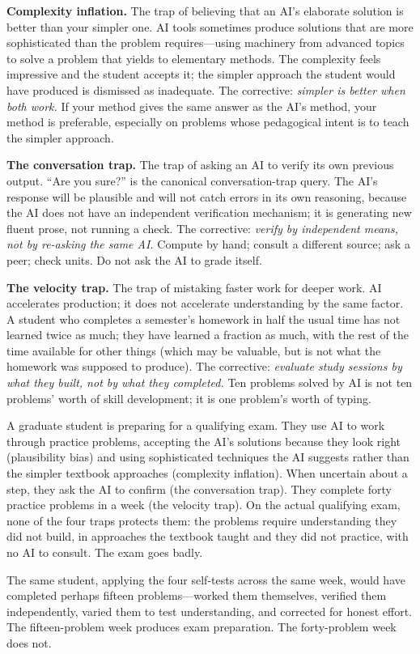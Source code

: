 \documentclass[11pt]{book}
\begin{document}
\textbf{Complexity inflation.} The trap of believing that an AI's elaborate solution is better than your simpler one. AI tools sometimes produce solutions that are more sophisticated than the problem requires---using machinery from advanced topics to solve a problem that yields to elementary methods. The complexity feels impressive and the student accepts it; the simpler approach the student would have produced is dismissed as inadequate. The corrective: \emph{simpler is better when both work.} If your method gives the same answer as the AI's method, your method is preferable, especially on problems whose pedagogical intent is to teach the simpler approach.

\textbf{The conversation trap.} The trap of asking an AI to verify its own previous output. ``Are you sure?'' is the canonical conversation-trap query. The AI's response will be plausible and will not catch errors in its own reasoning, because the AI does not have an independent verification mechanism; it is generating new fluent prose, not running a check. The corrective: \emph{verify by independent means, not by re-asking the same AI.} Compute by hand; consult a different source; ask a peer; check units. Do not ask the AI to grade itself.

\textbf{The velocity trap.} The trap of mistaking faster work for deeper work. AI accelerates production; it does not accelerate understanding by the same factor. A student who completes a semester's homework in half the usual time has not learned twice as much; they have learned a fraction as much, with the rest of the time available for other things (which may be valuable, but is not what the homework was supposed to produce). The corrective: \emph{evaluate study sessions by what they built, not by what they completed.} Ten problems solved by AI is not ten problems' worth of skill development; it is one problem's worth of typing.

\begin{example}
A graduate student is preparing for a qualifying exam. They use AI to work through practice problems, accepting the AI's solutions because they look right (plausibility bias) and using sophisticated techniques the AI suggests rather than the simpler textbook approaches (complexity inflation). When uncertain about a step, they ask the AI to confirm (the conversation trap). They complete forty practice problems in a week (the velocity trap). On the actual qualifying exam, none of the four traps protects them: the problems require understanding they did not build, in approaches the textbook taught and they did not practice, with no AI to consult. The exam goes badly.

The same student, applying the four self-tests across the same week, would have completed perhaps fifteen problems---worked them themselves, verified them independently, varied them to test understanding, and corrected for honest effort. The fifteen-problem week produces exam preparation. The forty-problem week does not.
\end{example}
\end{document}
